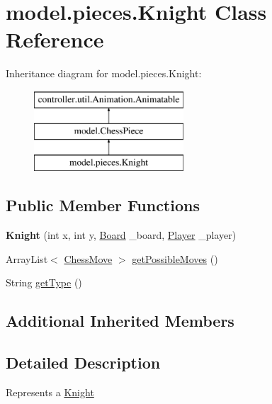 \hypertarget{classmodel_1_1pieces_1_1_knight}{\section{model.\-pieces.\-Knight Class Reference}
\label{classmodel_1_1pieces_1_1_knight}
}
Inheritance diagram for model.\-pieces.\-Knight\-:\begin{figure}[H]
\begin{center}
\leavevmode
\includegraphics[height=3.000000cm]{classmodel_1_1pieces_1_1_knight}
\end{center}
\end{figure}
\subsection*{Public Member Functions}
\begin{DoxyCompactItemize}
\item 
\hypertarget{classmodel_1_1pieces_1_1_knight_ad3ced5b31e4b389351cf67381dd5949b}{{\bfseries Knight} (int x, int y, \hyperlink{classmodel_1_1board_1_1_board}{Board} \-\_\-board, \hyperlink{classcontroller_1_1_player}{Player} \-\_\-player)}\label{classmodel_1_1pieces_1_1_knight_ad3ced5b31e4b389351cf67381dd5949b}

\item 
Array\-List$<$ \hyperlink{classmodel_1_1_chess_move}{Chess\-Move} $>$ \hyperlink{classmodel_1_1pieces_1_1_knight_a6fc2b0d4bef1c83e84c9351d0b67ae28}{get\-Possible\-Moves} ()
\item 
String \hyperlink{classmodel_1_1pieces_1_1_knight_a692ba3f99660d39fdbfd55c35d709bed}{get\-Type} ()
\end{DoxyCompactItemize}
\subsection*{Additional Inherited Members}


\subsection{Detailed Description}
Represents a \hyperlink{classmodel_1_1pieces_1_1_knight}{Knight}

